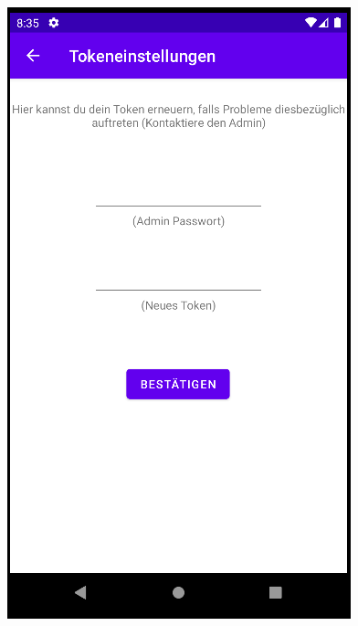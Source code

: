 \documentclass[ngerman]{tutorial}
\begin{document}
\begin{center}
    \includegraphics[scale=0.45]{token_new.png}
\end{center}



\newpage
\end{document}
